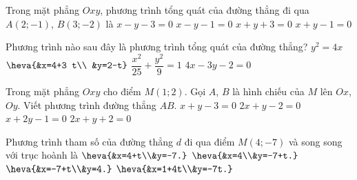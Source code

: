 \begin{ex}%
	Trong mặt phẳng $Oxy$, phương trình  tổng quát của đường thẳng đi qua $A(2;-1)$, $B(3;-2)$ là
	 \choice
		{$x-y-3=0$} 
		{$x-y-1=0$} 
		 {$x+y+3=0$}
		{\True  $x+y-1=0$}
\end{ex}

\begin{ex}%
	Phương trình nào sau đây là phương trình tổng quát  của đường thẳng?
	 \choice
		{$y^2=4x$} 
		{$\heva{&x=4+3 t\\  &y=2-t}$}
		 {$\dfrac{x^2}{25}+\dfrac{y^2}{9}=1$}
		 {\True $4x-3y-2=0$}
\end{ex}

\begin{ex}%
	Trong mặt phẳng $Oxy$ cho điểm  $M(1;2)$. Gọi $A$, $B$ là hình chiếu của $M$ lên $Ox$, $Oy$. Viết phương trình đường thẳng $AB$.
	\choice 
		 {$x+y-3=0$}
		 {\True $2x+y-2=0$}
		{$x+2y-1=0$} 
		 {$2x+y+2=0$}
\end{ex}

\begin{ex}%
	Phương trình tham số của  đường thẳng $d$ đi qua điểm $M(4;-7)$ và song song với trục hoành là
	\def\dotEX{} 
	\choice 
		 {$\heva{&x=4+t\\&y=-7.}$}
		{\True $\heva{&x=4\\&y=-7+t.}$} 
		{$\heva{&x=-7+t\\&y=4.}$} 
		 {$\heva{&x=1+4t\\&y=-7t.}$}
\end{ex}


